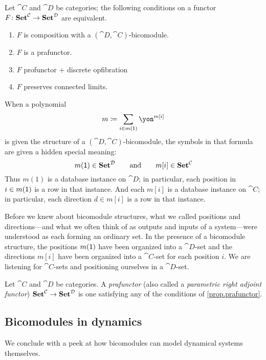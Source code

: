 \documentclass[Book-Poly]{subfiles}
\begin{document}
\begin{proposition}[Garner]\label{prop.prafunctor}
Let $\cat{C}$ and $\cat{D}$ be categories; the following conditions on a functor $F\colon\mathbf{Set}^{\mathcal{C}}\to\mathbf{Set}^{\mathcal{D}}$ are equivalent.
\begin{enumerate}
	\item $F$ is composition with a $(\cat{D},\cat{C})$-bicomodule.
	\item $F$ is a prafunctor.
	\item $F$ profunctor + discrete opfibration
	\item $F$ preserves connected limits.
\end{enumerate}
\end{proposition}

When a polynomial
\[
m\coloneqq\sum_{i\in m(\1)}\yon^{m[i]}
\]
is given the structure of a $(\cat{D},\cat{C})$-bicomodule, the symbols in that formula are given a hidden special meaning:
\[
  m(\textsf{1})\in\mathbf{Set}^{\mathcal{D}}
  \qquad\text{and}\qquad
	m[i]\in\mathbf{Set}^{\mathcal{C}}
\]
Thus $m(1)$ is a database instance on $\cat{D}$; in particular, each position in $i\in m(\textsf{1})$ is a row in that instance. And each $m[i]$ is a database instance on $\cat{C}$; in particular, each direction $d\in m[i]$ is a row in that instance.

Before we knew about bicomodule structures, what we called positions and directions---and what we often think of as outputs and inputs of a system---were understood as each forming an ordinary set. In the presence of a bicomodule structure, the positions $m(\textsf{1})$ have been organized into a $\cat{D}$-set and the directions $m[i]$ have been organized into a $\cat{C}$-set for each position $i$. We are listening for $\cat{C}$-sets and positioning ourselves in a $\cat{D}$-set.


\begin{definition}[Prafunctor]
Let $\cat{C}$ and $\cat{D}$ be categories. A \emph{prafunctor} (also called a \emph{parametric right adjoint functor}) $\mathbf{Set}^{\mathcal{C}}\to\mathbf{Set}^{\mathcal{D}}$ is one satisfying any of the conditions of \cref{prop.prafunctor}.
\end{definition}

\subsection{Bicomodules in dynamics}

We conclude with a peek at how bicomodules can model dynamical systems themselves.
\end{document}
